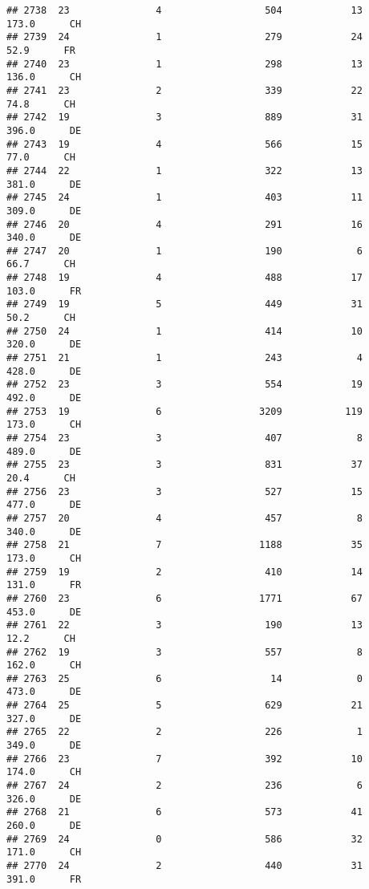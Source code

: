 \documentclass[
]{article}
\begin{document}
\begin{verbatim}
## 2738  23               4                  504            13    173.0      CH
## 2739  24               1                  279            24     52.9      FR
## 2740  23               1                  298            13    136.0      CH
## 2741  23               2                  339            22     74.8      CH
## 2742  19               3                  889            31    396.0      DE
## 2743  19               4                  566            15     77.0      CH
## 2744  22               1                  322            13    381.0      DE
## 2745  24               1                  403            11    309.0      DE
## 2746  20               4                  291            16    340.0      DE
## 2747  20               1                  190             6     66.7      CH
## 2748  19               4                  488            17    103.0      FR
## 2749  19               5                  449            31     50.2      CH
## 2750  24               1                  414            10    320.0      DE
## 2751  21               1                  243             4    428.0      DE
## 2752  23               3                  554            19    492.0      DE
## 2753  19               6                 3209           119    173.0      CH
## 2754  23               3                  407             8    489.0      DE
## 2755  23               3                  831            37     20.4      CH
## 2756  23               3                  527            15    477.0      DE
## 2757  20               4                  457             8    340.0      DE
## 2758  21               7                 1188            35    173.0      CH
## 2759  19               2                  410            14    131.0      FR
## 2760  23               6                 1771            67    453.0      DE
## 2761  22               3                  190            13     12.2      CH
## 2762  19               3                  557             8    162.0      CH
## 2763  25               6                   14             0    473.0      DE
## 2764  25               5                  629            21    327.0      DE
## 2765  22               2                  226             1    349.0      DE
## 2766  23               7                  392            10    174.0      CH
## 2767  24               2                  236             6    326.0      DE
## 2768  21               6                  573            41    260.0      DE
## 2769  24               0                  586            32    171.0      CH
## 2770  24               2                  440            31    391.0      FR

\end{verbatim}
\end{document}
